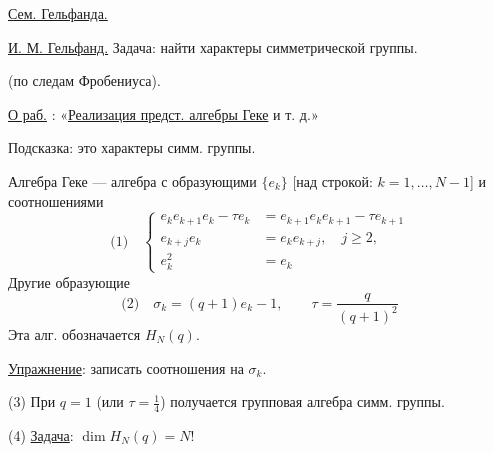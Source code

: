 \qquad \uline{Сем. Гельфанда.}

\uline{И. М. Гельфанд.} Задача: найти характеры симметрической группы.

(по следам Фробениуса).

\uline{О раб.} : «\uline{Реализация предст. алгебры Геке} и т. д.»

Подсказка: это характеры симм. группы.

Алгебра Геке — алгебра с образующими \(\{e_k\}\) [над строкой: \(k=1,\ldots,N-1\)] и соотношениями
\[
\text{(1)}\quad
\left\{\begin{aligned}
e_k e_{k+1}e_k-\tau e_k&=e_{k+1}e_ke_{k+1}-\tau e_{k+1}\\
e_{k+j}e_k&=e_ke_{k+j},\quad j\geqslant 2,\\
e_k^2&=e_k
\end{aligned}\right.
\]
Другие образующие
\[
\text{(2)}\quad \sigma_k=(q+1)e_k-1,\qquad \tau=\frac{q}{(q+1)^2}
\]
Эта алг. обозначается \(H_N(q)\).

\uline{Упражнение}: записать соотношения на \(\sigma_k\).

(3) При \(q=1\) (или \(\tau=\frac14\)) получается групповая алгебра симм. группы.

(4) \uline{Задача}: \(\dim H_N(q)=N!\)

